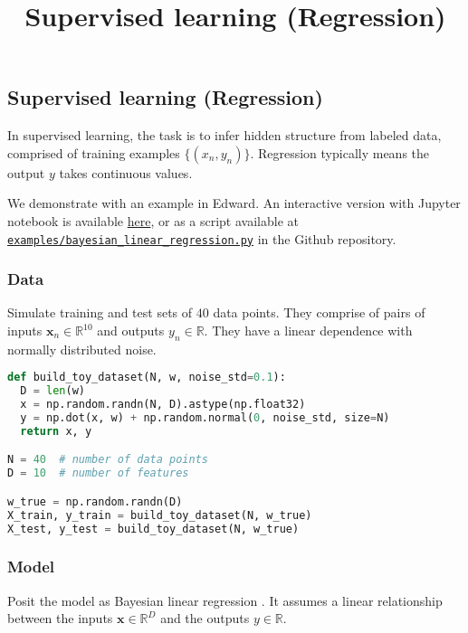 \title{Supervised learning (Regression)}

\subsection{Supervised learning (Regression)}

In supervised learning, the task is to infer hidden structure from
labeled data, comprised of training examples $\{(x_n, y_n)\}$.
Regression typically means the output $y$ takes continuous values.

We demonstrate with an example in Edward.
An interactive version with Jupyter notebook is available
\href{http://nbviewer.jupyter.org/github/blei-lab/edward/blob/master/docs/notebooks/supervised_regression.ipynb}{here},
or as a script available at
\href{https://github.com/blei-lab/edward/blob/master/examples/bayesian_linear_regression.py}
{\texttt{examples/bayesian_linear_regression.py}} in the Github repository.

\subsubsection{Data}

Simulate training and test sets of $40$ data points. They comprise of
pairs of inputs $\mathbf{x}_n\in\mathbb{R}^{10}$ and outputs
$y_n\in\mathbb{R}$. They have a linear dependence with normally
distributed noise.

\begin{lstlisting}[language=Python]
def build_toy_dataset(N, w, noise_std=0.1):
  D = len(w)
  x = np.random.randn(N, D).astype(np.float32)
  y = np.dot(x, w) + np.random.normal(0, noise_std, size=N)
  return x, y

N = 40  # number of data points
D = 10  # number of features

w_true = np.random.randn(D)
X_train, y_train = build_toy_dataset(N, w_true)
X_test, y_test = build_toy_dataset(N, w_true)
\end{lstlisting}

\subsubsection{Model}

Posit the model as Bayesian linear regression \citep{murphy2012machine}.
It assumes a linear relationship between the inputs
$\mathbf{x}\in\mathbb{R}^D$ and the outputs $y\in\mathbb{R}$.

